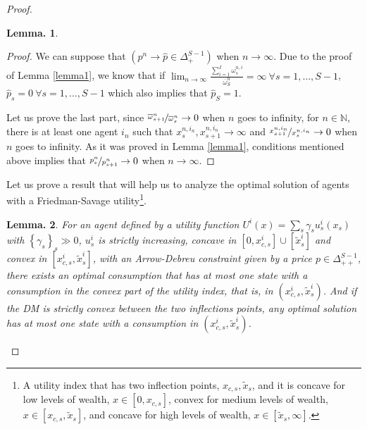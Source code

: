 \documentclass[pdftex]{article}
\numberwithin{equation}{section}
\theoremstyle{th}
\newtheorem{lemma}{{Lemma}.}%
\newtheorem{proof lemma}{{Proof Lemma}.}
\theoremstyle{definition}
\begin{document}
{\begin{proof}
\begin{lemma}
\end{lemma}

\begin{proof}We can suppose that $\left(p^{n}\rightarrow\hat{p}\in\Delta_{+}^{S-1}\right)$
when $n\rightarrow\infty$. Due to the proof of Lemma \ref{lemma1}, we know that if $\lim_{n\rightarrow\infty}\frac{\sum_{i=1}^I\omega_s^{n,i}}{\overline{\omega}^n_S}=\infty\ \forall{s}=1,\dots,S-1$, $\hat{p}_{s}=0\ \forall{s}=1,\dots,S-1$ which also implies that $\hat{p}_{S}=1$.


Let us prove the last part, since $\nicefrac{\overline{\omega}_{s+1}^{n}}{\overline{\omega}_{s}^{n}}\rightarrow0$
when $n$ goes to infinity, for $n\in\mathbb{N}$, there is at least
one agent $i_n$ such that $x_{s}^{n,i_n},x_{s+1}^{n,i_n}\rightarrow\infty$ and $\nicefrac{x_{s+1}^{n,i_n}}{x_{s}^{n,i_n}}\rightarrow0$
when $n$ goes to infinity. As it was proved in Lemma \ref{lemma1}, conditions mentioned above implies that $\nicefrac{p_{s}^{n}}{p_{s+1}^{n}}\rightarrow0$ when
$n\rightarrow\infty$.

\end{proof} 


Let us prove a result that will help us to analyze the optimal
solution of agents with a Friedman-Savage utility\footnote{A utility index that has two inflection points, $x_{c,s},\tilde{x}_s$, and it is concave for low levels of wealth, $x\in[0,x_{c,s}]$, convex for medium levels of wealth, $x\in[x_{c,s},\tilde{x}_s]$, and concave for high levels of wealth, $x\in[\tilde{x}_s,\infty]$.}.

\begin{lemma}

\label{lemma4} For an agent defined by a utility function $U^{i}(x)=\sum_{s}\gamma_{s}u_{s}^{i}(x_{s})$
with $\left\{ \gamma_{s}\right\} _{s}\gg0$, ${u_{s}^{i}}$ is strictly
increasing, concave in $[0,x_{c,s}^{i}]\cup[\tilde{x}_{s}^{i}]$ and
convex in $[x_{c,s}^{i},\tilde{x}_{s}^{i}]$, with an Arrow-Debreu
constraint given by a price $p\in\Delta_{++}^{S-1}$, there exists
an optimal consumption that has at most one state with a consumption
in the convex part of the utility index, that is, in $(x_{c,s}^{i},\tilde{x}_{s}^{i})$. And if the DM is strictly convex between
the two inflections points, any optimal solution has at most one state
with a consumption in $(x_{c,s}^{i},\tilde{x}_{s}^{i})$.


\end{lemma}
\end{proof}}
\end{document}
